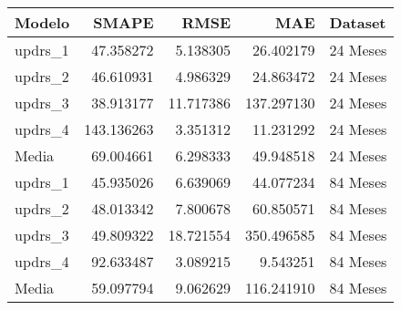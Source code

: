 \begin{tabular}{lrrrl}
\toprule
Modelo & SMAPE & RMSE & MAE & Dataset \\
\midrule
updrs_1 & 47.358272 & 5.138305 & 26.402179 & 24 Meses \\
updrs_2 & 46.610931 & 4.986329 & 24.863472 & 24 Meses \\
updrs_3 & 38.913177 & 11.717386 & 137.297130 & 24 Meses \\
updrs_4 & 143.136263 & 3.351312 & 11.231292 & 24 Meses \\
Media & 69.004661 & 6.298333 & 49.948518 & 24 Meses \\
updrs_1 & 45.935026 & 6.639069 & 44.077234 & 84 Meses \\
updrs_2 & 48.013342 & 7.800678 & 60.850571 & 84 Meses \\
updrs_3 & 49.809322 & 18.721554 & 350.496585 & 84 Meses \\
updrs_4 & 92.633487 & 3.089215 & 9.543251 & 84 Meses \\
Media & 59.097794 & 9.062629 & 116.241910 & 84 Meses \\
\bottomrule
\end{tabular}
